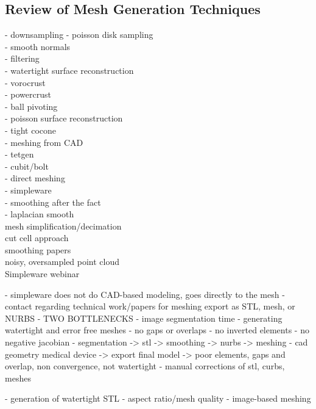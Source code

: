 \documentclass[12pt]{article}
\begin{document}
\subsection{Review of Mesh Generation Techniques}
\label{Review of Mesh Generation Techniques}

- downsampling - poisson disk sampling\\
- smooth normals\\
- filtering\\

- watertight surface reconstruction\\
	- vorocrust\\
	- powercrust\\
	- ball pivoting\\
	- poisson surface reconstruction\\
	- tight cocone\\
	
- meshing from CAD\\
    - tetgen\\
    - cubit/bolt\\
    
- direct meshing\\
	- simpleware\\

- smoothing after the fact\\
	- laplacian smooth\\

mesh simplification/decimation\\
cut cell approach\\
smoothing papers\\

noisy, oversampled point cloud\\


Simpleware webinar

- simpleware does not do CAD-based modeling, goes directly to the mesh
- contact regarding technical work/papers for meshing
export as STL, mesh, or NURBS
- TWO BOTTLENECKS
  - image segmentation time
  - generating watertight and error free meshes
    - no gaps or overlaps 
    - no inverted elements 
    - no negative jacobian
- segmentation -> stl -> smoothing -> nurbs -> meshing -  cad geometry medical device -> export final model -> poor elements, gaps and overlap, non convergence, not watertight
- manual corrections of stl, curbs, meshes

- generation of watertight STL
- aspect ratio/mesh quality
- image-based meshing
\end{document}
